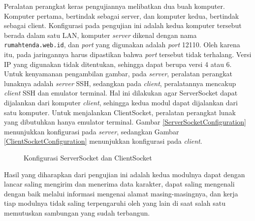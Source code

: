 Peralatan perangkat keras pengujiannya melibatkan dua buah komputer.
Komputer pertama, bertindak sebagai server,
dan komputer kedua, bertindak sebagai client.
Konfigurasi pada pengujian ini adalah kedua komputer tersebut berada dalam satu LAN,
komputer \textit{server} dikenal dengan nama \texttt{rumahtenda.web.id},
dan \textit{port} yang digunakan adalah \textit{port} 12110.
Oleh karena itu, pada jaringannya harus dipastikan bahwa \textit{port} tersebut tidak terhalang.
Versi IP yang digunakan tidak ditentukan, sehingga dapat berupa versi 4 atau 6.
Untuk kenyamanan pengambilan gambar,
pada \textit{server}, peralatan perangkat lunaknya adalah \textit{server} SSH,
sedangkan pada \textit{client}, peralatannya mencakup \textit{client} SSH dan emulator terminal.
Hal ini dilakukan agar ServerSocket dapat dijalankan dari komputer \textit{client},
sehingga kedua modul dapat dijalankan dari satu komputer.
Untuk menjalankan ClientSocket, peralatan perangkat lunak yang dibutuhkan hanya emulator terminal.
Gambar \ref{ServerSocketConfiguration} menunjukkan konfigurasi pada \textit{server},
sedangkan Gambar \ref{ClientSocketConfiguration} menunjukkan konfigurasi pada \textit{client}.

\begin{figure}
\centering
{}
\caption{Konfigurasi ServerSocket dan ClientSocket}
\label{SocketConfiguration}
\end{figure}

Hasil yang diharapkan dari pengujian ini adalah kedua modulnya dapat dengan lancar saling mengirim dan menerima data karakter,
dapat saling mengenali dengan baik melalui informasi mengenai alamat masing-masingnya,
dan kerja tiap modulnya tidak saling terpengaruhi oleh yang lain di saat salah satu memutuskan sambungan yang sudah terbangun.

